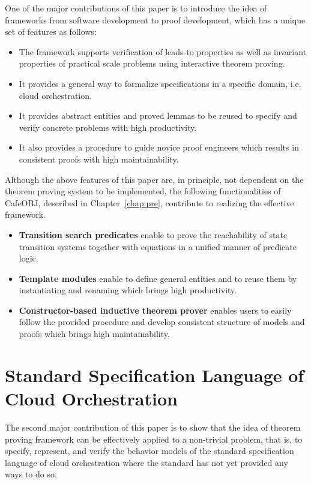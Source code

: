 \documentclass[12pt]{report}
\begin{document}
One of the major contributions of this paper is to introduce the idea
of frameworks from software development to proof development, which has
a unique set of features as follows:
\vspace{-0.3cm}
\begin{itemize}
\setlength{\parskip}{0cm}
\setlength{\itemsep}{0cm}
\item The framework supports verification of leads-to properties as
  well as invariant properties of practical scale problems using
  interactive theorem proving.
\item It provides a general way to formalize specifications in a
  specific domain, i.e. cloud orchestration.
\item It provides abstract entities and proved lemmas to be reused to
  specify and verify concrete problems with high productivity.
\item It also provides a procedure to guide novice proof engineers
  which results in consistent proofs with high maintainability.
\end{itemize}
Although the above features of ​​this paper are, in principle, not
dependent on the theorem proving system to be implemented, the
following functionalities of CafeOBJ, described in
Chapter~\ref{chap:pre}, contribute to realizing the effective
framework.
\begin{itemize}
\item {\bf Transition search predicates} enable to prove the
  reachability of state transition systems together with equations in
  a unified manner of predicate logic.
\item {\bf Template modules} enable to define general entities and to
  reuse them by instantiating and renaming which brings high
  productivity.
\item {\bf Constructor-based inductive theorem prover} enables users
  to easily follow the provided procedure and develop consistent
  structure of models and proofs which brings high maintainability.
\end{itemize}

\section{Standard Specification Language of Cloud Orchestration}
The second major contribution of this paper is to show that the idea
of theorem proving framework can be effectively applied to a non-trivial
problem, that is, to specify, represent, and verify the behavior
models of the standard specification language of cloud orchestration
where the standard has not yet provided any ways to do so.
\end{document}
